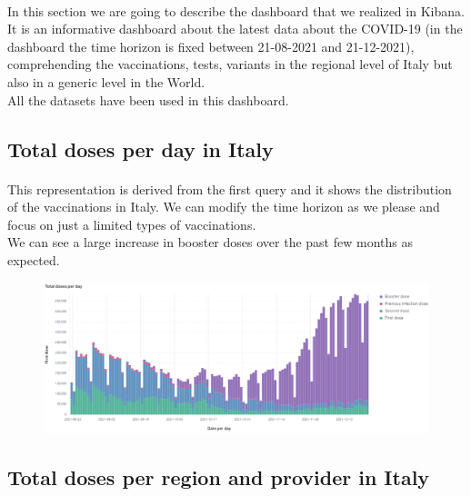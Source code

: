 \documentclass[a4paper,12pt]{article}
\begin{document}
\paragraph{} In this section we are going to describe the dashboard that we realized in Kibana.
It is an informative dashboard about the latest data about the COVID-19 (in the dashboard the time horizon is fixed between 21-08-2021 and 21-12-2021), comprehending the vaccinations, tests, variants in the regional level of Italy but also in a generic level in the World.\\
All the datasets have been used in this dashboard.
\subsection{Total doses per day in Italy}

\paragraph{}This representation is derived from the first query and it shows the distribution of the vaccinations in Italy.
We can modify the time horizon as we please and focus on just a limited types of vaccinations.\\
We can see a large increase in booster doses over the past few months as expected.
\begin{figure}[h]
	\centering
  \includegraphics[width=\linewidth]{dashboards/dash1.png}
\end{figure}
\clearpage
\subsection{Total doses per region and provider in Italy}
\end{document}
